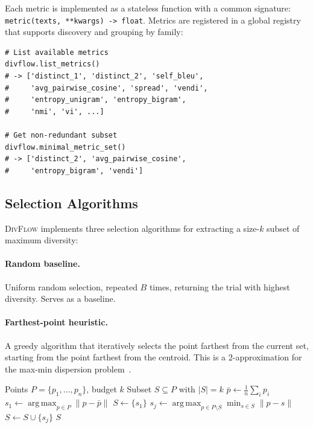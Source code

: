 \documentclass[11pt,a4paper]{article}
\newcommand{\divflow}{\textsc{DivFlow}}
\DeclareMathOperator*{\argmax}{arg\,max}
\begin{document}
Each metric is implemented as a stateless function with
a common signature:
\texttt{metric(texts, **kwargs) -> float}.
Metrics are registered in a global registry that supports
discovery and grouping by family:

\begin{verbatim}
# List available metrics
divflow.list_metrics()
# -> ['distinct_1', 'distinct_2', 'self_bleu',
#     'avg_pairwise_cosine', 'spread', 'vendi',
#     'entropy_unigram', 'entropy_bigram',
#     'nmi', 'vi', ...]

# Get non-redundant subset
divflow.minimal_metric_set()
# -> ['distinct_2', 'avg_pairwise_cosine',
#     'entropy_bigram', 'vendi']
\end{verbatim}

\subsection{Selection Algorithms}\label{sec:selection}

\divflow{} implements three selection algorithms for
extracting a size-$k$ subset of maximum diversity:

\paragraph{Random baseline.}
Uniform random selection, repeated $B$ times, returning
the trial with highest diversity.  Serves as a baseline.

\paragraph{Farthest-point heuristic.}
A greedy algorithm that iteratively selects the point
farthest from the current set, starting from the
point farthest from the centroid.  This is a
2-approximation for the max-min dispersion
problem~\citep{ravi1994heuristic}.

\begin{algorithm}[t]
\caption{Farthest-Point Selection}
\label{alg:farthest}
\begin{algorithmic}[1]
\Require Points $P = \{p_1, \ldots, p_n\}$, budget $k$
\Ensure Subset $S \subseteq P$ with $|S| = k$
\State $\bar{p} \gets \frac{1}{n}\sum_{i} p_i$
\State $s_1 \gets \argmax_{p \in P} \|p - \bar{p}\|$
\State $S \gets \{s_1\}$
    \State $s_j \gets \argmax_{p \in P \setminus S}
           \min_{s \in S} \|p - s\|$
    \State $S \gets S \cup \{s_j\}$
\EndFor
\State \Return $S$
\end{algorithmic}
\end{algorithm}
\end{document}
